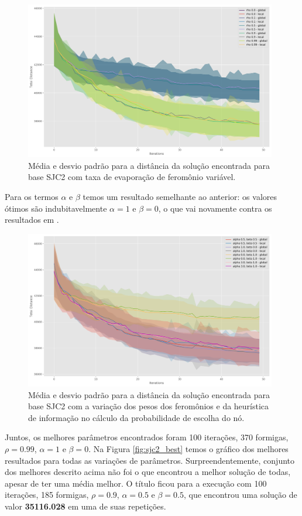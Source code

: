 \begin{figure}[h]	
  \centering
  \includegraphics[width=11cm,keepaspectratio]{images/SJC2_rho.png}
  \caption{Média e desvio padrão para a distância da solução encontrada para base SJC2 com taxa de evaporação de feromônio variável.}
  \label{fig:sjc2_rho}
\end{figure}

Para os termos $\alpha$ e $\beta$ temos um resultado semelhante ao anterior: os valores ótimos são indubitavelmente $\alpha=1$ e $\beta=0$, o que vai novamente contra os resultados em \cite{de2005max}.

\begin{figure}[h]	
  \centering
  \includegraphics[width=11cm,keepaspectratio]{images/SJC2_alpha_beta.png}
  \caption{Média e desvio padrão para a distância da solução encontrada para base SJC2 com a variação dos pesos dos feromônios e da heurística de informação no cálculo da probabilidade de escolha do nó.}
  \label{fig:sjc2_alpha_beta}
\end{figure}

Juntos, os melhores parâmetros encontrados foram 100 iterações, 370 formigas, $\rho = 0.99$, $\alpha=1$ e $\beta=0$. Na Figura \ref{fig:sjc2_best} temos o gráfico dos melhores resultados para todas as variações de parâmetros. Surpreendentemente, conjunto dos melhores descrito acima não foi o que encontrou a melhor solução de todas, apesar de ter uma média melhor. O título ficou para a execução com 100 iterações, 185 formigas, $\rho = 0.9$, $\alpha=0.5$ e $\beta=0.5$, que encontrou uma solução de valor \textbf{35116.028} em uma de suas repetições.

